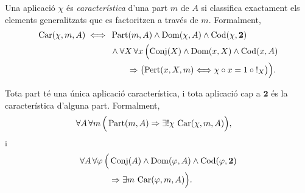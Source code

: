 \begin{definicio}\label{def:caracteristica}
Una aplicació \(\chi\) és \emph{característica} d'una part \(m\) de \(A\) si classifica exactament els elements generalitzats que es factoritzen a través de \(m\). Formalment,
\[
\begin{aligned}
\operatorname{Car}(\chi,m,A)
\iff {}&
\operatorname{Part}(m,A)\land\operatorname{Dom}(\chi,A)\land\operatorname{Cod}(\chi,\mathbf2)
\\
&{}\land
\forall X\,\forall x\,
\Bigl(
\operatorname{Conj}(X)\land\operatorname{Dom}(x,X)\land\operatorname{Cod}(x,A)
\\
&\qquad{}\Rightarrow
\bigl(
\operatorname{Pert}(x,X,m)
\Longleftrightarrow
\chi\circ x=1\circ {!}_X
\bigr)
\Bigr).
\end{aligned}
\]
\end{definicio}

\begin{axioma}\label{ax:representacio}
Tota part té una única aplicació característica, i tota aplicació cap a \(\mathbf2\) és la característica d'alguna part. Formalment,
\[
\begin{aligned}
\forall A\,\forall m\,\Bigl(&
\operatorname{Part}(m,A)
\Rightarrow
\exists!\chi\,\operatorname{Car}(\chi,m,A)
\Bigr),
\end{aligned}
\]
i
\[
\begin{aligned}
\forall A\,\forall\varphi\,\Bigl(&
\operatorname{Conj}(A)\land\operatorname{Dom}(\varphi,A)\land\operatorname{Cod}(\varphi,\mathbf2)
\\
&{}\Rightarrow
\exists m\,\operatorname{Car}(\varphi,m,A)
\Bigr).
\end{aligned}
\]
\end{axioma}

